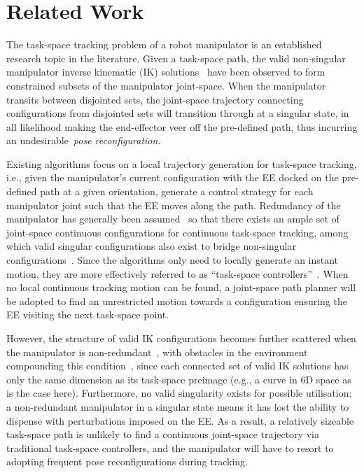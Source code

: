 \documentclass[letterpaper, 10 pt, conference]{ieeeconf}  %
\begin{document}
\section{Related Work}\label{section:related_work}
The task-space tracking problem of a robot manipulator is an established research topic in the literature. Given a task-space path, the valid non-singular manipulator inverse kinematic (IK) solutions~\cite{Lavalle2006Planning} have been observed to form constrained subsets of the manipulator joint-space. 
When the manipulator transits between disjointed sets, the joint-space trajectory connecting configurations from disjointed sets will transition through at a singular state, in all likelihood making the end-effector veer off the pre-defined path, thus incurring an undesirable~\textit{pose reconfiguration}. 

Existing algorithms focus on a local trajectory generation for task-space tracking, i.e., given the manipulator's current configuration with the EE docked on the pre-defined path at a given orientation, generate a control strategy for each manipulator joint such that the EE moves along the path. 
Redundancy of the manipulator has generally been assumed~\cite{Egeland1987Task} so that there exists an ample set of joint-space continuous configurations for continuous task-space tracking, among which valid singular configurations also exist to bridge non-singular configurations~\cite{Porta2012Randomized}. 
Since the algorithms only need to locally generate an instant motion, they are more effectively referred to as ``task-space controllers''~\cite{Xian2004Task}. 
When no local continuous tracking motion can be found, a joint-space path planner will be adopted to find an unrestricted motion towards a configuration ensuring the EE visiting the next task-space point. 

However, the structure of valid IK configurations becomes further scattered when the manipulator is non-redundant~\cite{Mayorga1987Singularities}, with obstacles in the environment compounding this condition~\cite{Khatib1986Real}, since each connected set of valid IK solutions has only the same dimension as its task-space preimage (e.g., a curve in 6D space as is the case here). Furthermore, no valid singularity exists for possible utilisation: a non-redundant manipulator in a singular state means it has lost the ability to dispense with perturbations imposed on the EE. As a result, a relatively sizeable task-space path is unlikely to find a continuous joint-space trajectory via traditional task-space controllers, and the manipulator will have to resort to adopting frequent pose reconfigurations during tracking. %
\end{document}
